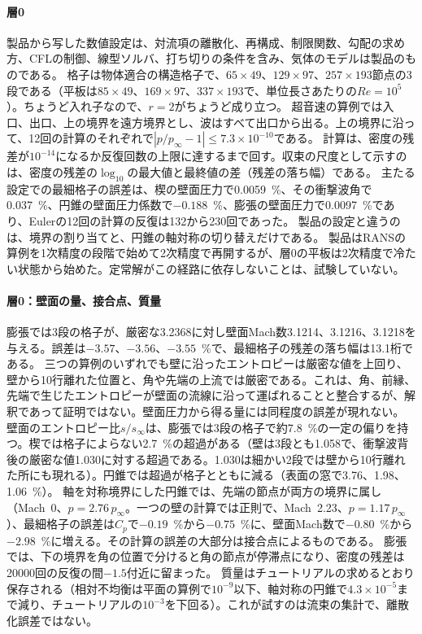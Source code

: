 \documentclass[twocolumn]{labreport}
\newcommand{\Cp}{C_p}
\newcommand{\pinf}{p_\infty}
\begin{document}
\paragraph{層0}
製品から写した数値設定は、対流項の離散化、再構成、制限関数、勾配の求め方、CFLの制御、線型ソルバ、打ち切りの条件を含み、気体のモデルは製品のものである。
格子は物体適合の構造格子で、$65\times49$、$129\times97$、$257\times193$節点の3段である（平板は$85\times49$、$169\times97$、$337\times193$で、単位長さあたりの$Re=10^5$）。ちょうど入れ子なので、$r=2$がちょうど成り立つ。
超音速の算例では入口、出口、上の境界を遠方境界とし、波はすべて出口から出る。上の境界に沿って、12回の計算のそれぞれで$|p/\pinf-1|\le7.3\times10^{-10}$である。
計算は、密度の残差が$10^{-14}$になるか反復回数の上限に達するまで回す。収束の尺度として示すのは、密度の残差の$\log_{10}$の最大値と最終値の差（残差の落ち幅）である。
主たる設定での最細格子の誤差は、楔の壁面圧力で0.0059~\%、その衝撃波角で0.037~\%、円錐の壁面圧力係数で$-0.188$~\%、膨張の壁面圧力で0.0097~\%であり、Eulerの12回の計算の反復は132から230回であった。
製品の設定と違うのは、境界の割り当てと、円錐の軸対称の切り替えだけである。
製品はRANSの算例を1次精度の段階で始めて2次精度で再開するが、層0の平板は2次精度で冷たい状態から始めた。定常解がこの経路に依存しないことは、試験していない。

\paragraph{層0：壁面の量、接合点、質量}
膨張では3段の格子が、厳密な3.2368に対し壁面Mach数3.1214、3.1216、3.1218を与える。誤差は$-3.57$、$-3.56$、$-3.55$~\%で、最細格子の残差の落ち幅は13.1桁である。
三つの算例のいずれでも壁に沿ったエントロピーは厳密な値を上回り、壁から10行離れた位置と、角や先端の上流では厳密である。これは、角、前縁、先端で生じたエントロピーが壁面の流線に沿って運ばれることと整合するが、解釈であって証明ではない。壁面圧力から得る量には同程度の誤差が現れない。
壁面のエントロピー比$s/s_\infty$は、膨張では3段の格子で約7.8~\%の一定の偏りを持つ。楔では格子によらない2.7~\%の超過がある（壁は3段とも1.058で、衝撃波背後の厳密な値1.030に対する超過である。1.030は細かい2段では壁から10行離れた所にも現れる）。円錐では超過が格子とともに減る（表面の窓で3.76、1.98、1.06~\%）。
軸を対称境界にした円錐では、先端の節点が両方の境界に属し（Mach~0、$p=2.76\,\pinf$。一つの壁の計算では正則で、Mach~2.23、$p=1.17\,\pinf$）、最細格子の誤差は$\Cp$で$-0.19$~\%から$-0.75$~\%に、壁面Mach数で$-0.80$~\%から$-2.98$~\%に増える。その計算の誤差の大部分は接合点によるものである。
膨張では、下の境界を角の位置で分けると角の節点が停滞点になり、密度の残差は20000回の反復の間$-1.5$付近に留まった。
質量はチュートリアルの求めるとおり保存される（相対不均衡は平面の算例で$10^{-9}$以下、軸対称の円錐で$4.3\times10^{-5}$まで減り、チュートリアルの$10^{-3}$を下回る）。これが試すのは流束の集計で、離散化誤差ではない。
\end{document}
